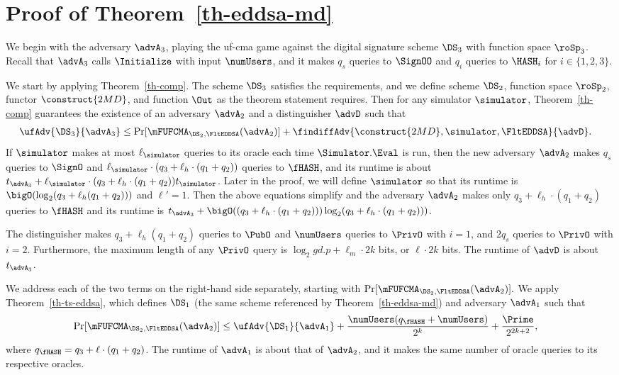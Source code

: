 \section{Proof of Theorem~\ref{th-eddsa-md}}
We begin with the adversary $\advA_3$, playing the uf-cma game against the digital signature scheme $\DS_3$ with function space $\roSp_3$. Recall that $\advA_3$ calls $\Initialize$ with input $\numUsers$, and it makes $q_s$ queries to $\SignOO$ and $q_i$ queries to $\HASH_i$ for $i \in \{1,2,3\}$. 

We start by applying Theorem~\ref{th-comp}. The scheme $\DS_3$ satisfies the requirements, and we define scheme $\DS_2$, function space $\roSp_2$, functor $\construct{2MD}$, and function $\Out$ as the theorem statement requires. Then for any simulator $\simulator$, Theorem~\ref{th-comp} guarantees the existence of an adversary $\advA_2$ and a distinguisher $\advD$ such that 
\begin{align}
\ufAdv{\DS_3}{\advA_3} &\leq
\Pr[\mFUFCMA_{\DS_2,\FltEDDSA}(\advA_2)]  +
\findiffAdv{\construct{2MD},\simulator,\FltEDDSA}{\advD}.
\end{align}
If $\simulator$ makes at most $\ell_{\simulator}$ queries to its oracle each time $\Simulator.\Eval$ is run, then 
the new adversary $\advA_2$ makes $q_s$ queries to $\SignO$ and $\ell_{\simulator}\cdot (q_3 + \ell_h\cdot(q_1+q_2))$ queries to $\fHASH$, and its runtime is about $t_{\advA_3} + \ell_{\simulator}\cdot (q_3 + \ell_h\cdot(q_1+q_2))t_{\simulator}$. Later in the proof, we will define $\simulator$ so that its runtime is $\bigO(\log_2 (q_3 + \ell_h (q_1 + q_2)))$ and $\ell' = 1$. Then the above equations simplify and the adversary $\advA_2$ makes only $q_3 + \ell_h\cdot(q_1+q_2)$ queries to $\fHASH$ and its runtime is $t_{\advA_3} + \bigO((q_3 + \ell_h\cdot(q_1+q_2)))\log_2 (q_3+\ell_h\cdot(q_1+q_2)))$. 


The distinguisher makes $q_3 + \ell_h(q_1+q_2)$ queries to $\PubO$ and $\numUsers$ queries to $\PrivO$ with $i=1$, and $2 q_s$ queries to $\PrivO$ with $i= 2$. Furthermore, the maximum length of any $\PrivO$ query is $\log_2 gd.p + \ell_m \cdot 2k$ bits, or $\ell \cdot 2k$ bits. The runtime of $\advD$ is about $t_{\advA_3}$. 

We address each of the two terms on the right-hand side separately, starting with $\Pr[\mFUFCMA_{\DS_2,\FltEDDSA}(\advA_2)].$ We apply Theorem~\ref{th-ts-eddsa}, which defines $\DS_1$ (the same scheme referenced by Theorem~\ref{th-eddsa-md}) and adversary $\advA_1$ such that 
\begin{align}
\Pr[\mFUFCMA_{\DS_2,\FltEDDSA}(\advA_2)]  &\leq \ufAdv{\DS_1}{\advA_1} + \frac{\numUsers(q_{\fHASH}+\numUsers)}{2^{k}}+\frac{\Prime}{2^{2k+2}},
\end{align}
where $q_{\fHASH} =  q_3 + \ell\cdot(q_1+q_2)$. The runtime of $\advA_1$ is about that of $\advA_2$, and it makes the same number of oracle queries to its respective oracles. 

